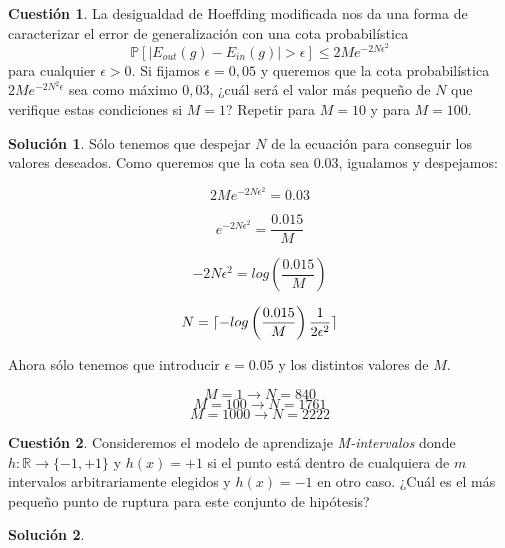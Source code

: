 \documentclass[a4paper, 11pt]{article}
\theoremstyle{definition}
\newtheorem{cuestion}{Cuestión}
\newtheorem*{solucion}{Solución}
\DeclarePairedDelimiter{\ceil}{\lceil}{\rceil}
\begin{document}
  \begin{cuestion}
  La desigualdad de Hoeffding modificada nos da una forma de caracterizar el error de generalización con una cota probabilística
  \[
  \mathds{P}[|E_{out}(g) - E_{in}(g)| > \epsilon] \leq 2Me^{-2N \epsilon^2}
  \]
  para cualquier $\epsilon > 0$. Si fijamos $\epsilon=0,05$ y queremos que la cota probabilística $2Me^{-2N^2 \epsilon}$ sea como máximo $0,03$, ¿cuál será el valor más pequeño de $N$ que verifique estas condiciones si $M=1$? Repetir para $M=10$ y para $M=100$.

  \end{cuestion}

  \begin{solucion}
    Sólo tenemos que despejar $N$ de la ecuación para conseguir los valores deseados. Como queremos que la cota sea $0.03$, igualamos y despejamos:

      \[
      2Me^{-2N\epsilon^2} = 0.03
      \]

      \[
      e^{-2N\epsilon^2} = \frac{0.015}{M}
      \]

      \[
      -2N\epsilon^2 = log\left(\frac{0.015}{M}\right)
      \]

      \[
      N = \ceil{-log\left(\frac{0.015}{M}\right) \frac{1}{2\epsilon^2}}
      \]

      Ahora sólo tenemos que introducir $\epsilon = 0.05$ y los distintos valores de $M$.

      $$M =  1 \rightarrow N =  840$$
      $$M =  100 \rightarrow N =  1761$$
      $$M =  1000 \rightarrow N =  2222$$

  \end{solucion}

  \begin{cuestion}
  Consideremos el modelo de aprendizaje \emph{M-intervalos} donde $h: \mathbb{R} \rightarrow \{-1, +1\}$ y $h(x)=+1$ si el punto está dentro de cualquiera de $m$ intervalos arbitrariamente elegidos y $h(x)=-1$ en otro caso. ¿Cuál es el más pequeño punto de ruptura para este conjunto de hipótesis?

  \end{cuestion}

  \begin{solucion}

  \end{solucion}
\end{document}
